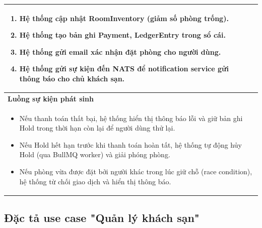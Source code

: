 \documentclass[13pt,a4paper,twoside]{report}
\begin{document}
\begin{longtable}{p{3.5cm} p{11.5cm}}
{\begin{enumerate}[nosep]
      \item Hệ thống cập nhật RoomInventory (giảm số phòng trống).
      \item Hệ thống tạo bản ghi Payment, LedgerEntry trong sổ cái.
      \item Hệ thống gửi email xác nhận đặt phòng cho người dùng.
      \item Hệ thống gửi sự kiện đến NATS để notification service gửi thông báo cho chủ khách sạn.
    \end{enumerate}
  } \\
  \midrule
  \multicolumn{2}{p{15cm}}{\textbf{Luồng sự kiện phát sinh}} \\
  \midrule
  \multicolumn{2}{p{15cm}}{%
    \begin{itemize}[nosep]
      \item Nếu thanh toán thất bại, hệ thống hiển thị thông báo lỗi và giữ bản ghi Hold trong thời hạn còn lại để người dùng thử lại.
      \item Nếu Hold hết hạn trước khi thanh toán hoàn tất, hệ thống tự động hủy Hold (qua BullMQ worker) và giải phóng phòng.
      \item Nếu phòng vừa được đặt bởi người khác trong lúc giữ chỗ (race condition), hệ thống từ chối giao dịch và hiển thị thông báo.
    \end{itemize}
  } \\
  \bottomrule
\end{longtable}

\subsection{Đặc tả use case "Quản lý khách sạn"}
\end{document}
